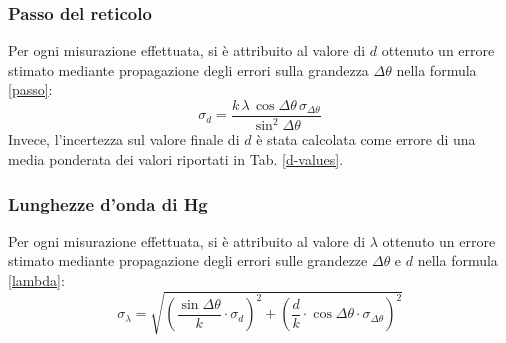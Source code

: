 \documentclass[]{article}
\begin{document}
    \subsubsection{Passo del reticolo}
    Per ogni misurazione effettuata, si è attribuito al valore di $d$ ottenuto un errore stimato mediante propagazione degli errori sulla grandezza $\Delta \theta$ nella formula \ref{passo}:
    \begin{equation}
        \label{d-error}
        \sigma_d = \frac{k \, \lambda \, \cos{\Delta\theta} \, \sigma_{\Delta \theta}}{\sin^2{\Delta\theta}}
    \end{equation}
    Invece, l'incertezza sul valore finale di $d$ è stata calcolata come errore di una media ponderata dei valori riportati in Tab. \ref{d-values}.
    \label{par:errore_passo}

    \subsubsection{Lunghezze d'onda di Hg}
    Per ogni misurazione effettuata, si è attribuito al valore di $\lambda$ ottenuto un errore stimato mediante propagazione degli errori sulle grandezze $\Delta \theta$ e $d$ nella formula \ref{lambda}:
    \begin{equation}
        \label{lambda-error}
        \sigma_{\lambda} = \sqrt{\left( \frac{\sin{\Delta\theta}}{k}  \cdot \sigma_d \right)^2 + \left(\frac{d}{k} \cdot \cos{\Delta\theta} \cdot \sigma_{\Delta\theta}\right)^2  } 
    \end{equation}
    \label{par:errore_lambda}
\end{document}

